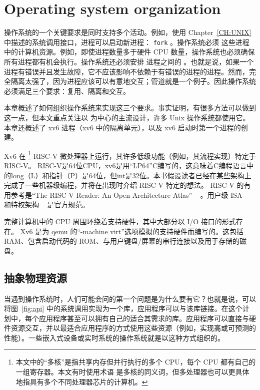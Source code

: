 


  

   \chapter{Operating system organization}   
    \label{CH:FIRST}     

操作系统的一个关键要求是同时支持多个活动。例如，使用 Chapter~\ref{CH:UNIX}    中描述的系统调用接口，进程可以启动新进程：
    \lstinline{fork}    。操作系统必须
        这些进程中的计算机资源。例如，即使进程数量多于硬件 CPU 数量，操作系统也必须确保所有进程都有机会执行。操作系统还必须安排
 进程之间的       。也就是说，如果一个进程有错误并且发生故障，它不应该影响不依赖于有错误的进程的进程。然而，完全隔离太强了，因为进程应该可以有意地交互；管道就是一个例子。因此操作系统必须满足三个要求：复用、隔离和交互。  

本章概述了如何组织操作系统来实现这三个要求。事实证明，有很多方法可以做到这一点，但本文重点关注以        为中心的主流设计，许多 Unix 操作系统都使用它。本章还概述了 xv6 进程（xv6 中的隔离单元），以及 xv6 启动时第一个进程的创建。  

Xv6 在           \footnote{本文中的“多核”是指共享内存但并行执行的多个 CPU，每个 CPU 都有自己的一组寄存器。本文有时使用术语
        是多核的同义词，但多处理器也可以更具体地指具有多个不同处理器芯片的计算机。  }    RISC-V 微处理器上运行，其许多低级功能（例如，其流程实现）特定于 RISC-V。 RISC-V是64位CPU，xv6是用“LP64”C编写的，这意味着C编程语言中的long（L）和指针（P）是64位，但int是32位。本书假设读者已经在某些架构上完成了一些机器级编程，并将在出现时介绍 RISC-V 特定的想法。 RISC-V 的有用参考是“The RISC-V Reader: An Open Architecture Atlas” ~\cite{riscv}   。用户级 ISA
    ~\cite{riscv:user}    和特权架构 ~\cite{riscv:priv}    是官方规范。  

完整计算机中的 CPU 周围环绕着支持硬件，其中大部分以 I/O 接口的形式存在。 Xv6 是为 qemu 的“-machine virt”选项模拟的支持硬件而编写的。这包括 RAM、包含启动代码的 ROM、与用户键盘/屏幕的串行连接以及用于存储的磁盘。
    \section{抽象物理资源  }     

当遇到操作系统时，人们可能会问的第一个问题是为什么要有它？也就是说，可以将图~\ref{fig:api}    中的系统调用实现为一个库，应用程序可以与该库链接。在这个计划中，每个应用程序甚至可以拥有自己的适合其需求的库。应用程序可以直接与硬件资源交互，并以最适合应用程序的方式使用这些资源（例如，实现高或可预测的性能）。一些嵌入式设备或实时系统的操作系统就是以这种方式组织的。  

